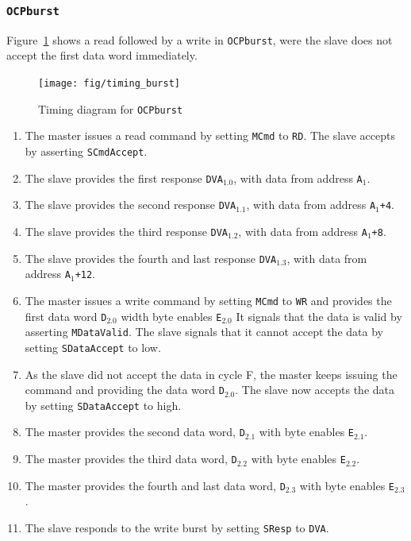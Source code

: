 \documentclass[a4paper,fontsize=10pt,twoside,DIV15,BCOR12mm,headinclude=true,footinclude=false,pagesize,bibtotoc]{scrbook}
\newcommand{\code}[1]{{\texttt{#1}}}
\begin{document}
\clearpage
\subsubsection{\code{OCPburst}}

Figure~\ref{fig:timing_burst} shows a read followed by a write in
\code{OCPburst}, were the slave does not accept the first data word
immediately.

\begin{figure}
\centering
\texttt{[image: fig/timing\_burst]}
\caption{Timing diagram for \code{OCPburst}}
\label{fig:timing_burst}
\end{figure}

\begin{enumerate}[A:]
\item The master issues a read command by setting \code{MCmd} to
  \code{RD}. The slave accepts by asserting \code{SCmdAccept}.
\item The slave provides the first response \code{DVA$_{1.0}$}, with
  data from address \code{A$_1$}.
\item The slave provides the second response \code{DVA$_{1.1}$}, with
  data from address \code{A$_1$+4}.
\item The slave provides the third response \code{DVA$_{1.2}$}, with
  data from address \code{A$_1$+8}.
\item The slave provides the fourth and last response
  \code{DVA$_{1.3}$}, with data from address \code{A$_1$+12}.
\item The master issues a write command by setting \code{MCmd} to
  \code{WR} and provides the first data word \code{D$_{2.0}$} width
  byte enables \code{E$_{2.0}$} It signals that the data is valid by
  asserting \code{MDataValid}. The slave signals that it cannot accept
  the data by setting \code{SDataAccept} to low.
\item As the slave did not accept the data in cycle F, the master
  keeps issuing the command and providing the data word
  \code{D$_{2.0}$}. The slave now accepts the data by setting
  \code{SDataAccept} to high.
\item The master provides the second data word, \code{D$_{2.1}$} with
  byte enables \code{E$_{2.1}$}.
\item The master provides the third data word, \code{D$_{2.2}$} with
  byte enables \code{E$_{2.2}$}.
\item The master provides the fourth and last data word,
  \code{D$_{2.3}$} with byte enables \code{E$_{2.3}$}.
\item The slave responds to the write burst by setting \code{SResp} to
  \code{DVA}.
\end{enumerate}
\end{document}
